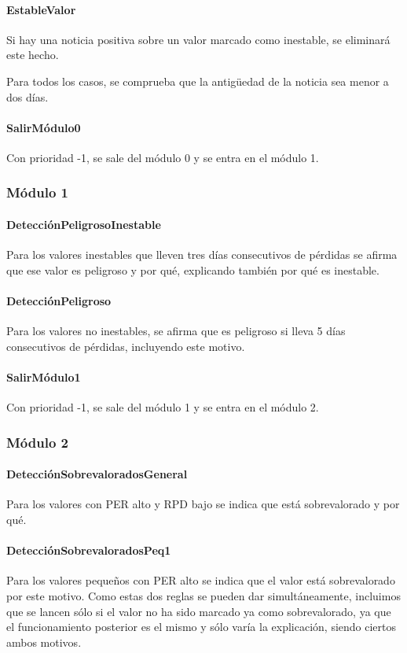 \documentclass[11pt,leqno]{article}
\theoremstyle{definition_wo_parentheses}
\theoremstyle{plain}
\theoremstyle{remark}
\begin{document}
\paragraph{EstableValor} Si hay una noticia positiva sobre un valor marcado como inestable, se eliminará este hecho.

Para todos los casos, se comprueba que la antigüedad de la noticia sea menor a dos días. 

\paragraph{SalirMódulo0} Con prioridad -1, se sale del módulo 0 y se entra en el módulo 1.

\subsubsection{Módulo 1} 

\paragraph{DetecciónPeligrosoInestable} Para los valores inestables que lleven tres días consecutivos de pérdidas se afirma que ese valor es peligroso y por qué, explicando también por qué es inestable.

\paragraph{DetecciónPeligroso} Para los valores no inestables, se afirma que es peligroso si lleva 5 días consecutivos de pérdidas, incluyendo este motivo.

\paragraph{SalirMódulo1} Con prioridad -1, se sale del módulo 1 y se entra en el módulo 2.


\subsubsection{Módulo 2}

\paragraph{DetecciónSobrevaloradosGeneral} Para los valores con PER alto y RPD bajo se indica que está sobrevalorado y por qué. 

\paragraph{DetecciónSobrevaloradosPeq1} Para los valores pequeños con PER alto se indica que el valor está sobrevalorado por este motivo. Como estas dos reglas se pueden dar simultáneamente, incluimos que se lancen sólo si el valor no ha sido marcado ya como sobrevalorado, ya que el funcionamiento posterior es el mismo y sólo varía la explicación, siendo ciertos ambos motivos. 
\end{document}
